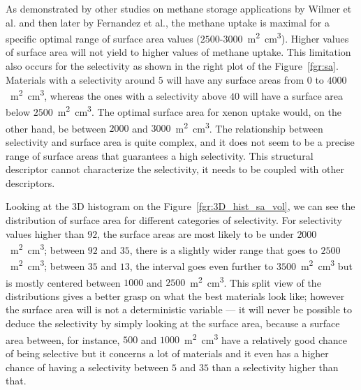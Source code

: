 \documentclass[main.tex]{subfiles}
\begin{document}
As demonstrated by other studies on methane storage applications by Wilmer et al.\autocite{Wilmer_2012} and then later by Fernandez et al.\autocite{Fernandez_2013}, the methane uptake is maximal for a specific optimal range of surface area values ($2500$-$3000$~\si{\square\meter\cubic\centi\meter}). Higher values of surface area will not yield to higher values of methane uptake. This limitation also occurs for the selectivity as shown in the right plot of the Figure~\ref{fgr:sa}. Materials with a selectivity around $5$ will have any surface areas from $0$ to $4000$~\si{\square\meter\cubic\centi\meter}, whereas the ones with a selectivity above $40$ will have a surface area below $2500$~\si{\square\meter\cubic\centi\meter}. The optimal surface area for xenon uptake would, on the other hand, be between $2000$ and $3000$~\si{\square\meter\cubic\centi\meter}. The relationship between selectivity and surface area is quite complex, and it does not seem to be a precise range of surface areas that guarantees a high selectivity. This structural descriptor cannot characterize the selectivity, it needs to be coupled with other descriptors. 

Looking at the 3D histogram on the Figure~\ref{fgr:3D_hist_sa_vol}, we can see the distribution of surface area for different categories of selectivity. For selectivity values higher than $92$, the surface areas are most likely to be under $2000$~\si{\square\meter\cubic\centi\meter}; between $92$ and $35$, there is a slightly wider range that goes to $2500$~\si{\square\meter\cubic\centi\meter}; between $35$ and $13$, the interval goes even further to $3500$~\si{\square\meter\cubic\centi\meter} but is mostly centered between $1000$ and $2500$~\si{\square\meter\cubic\centi\meter}. This split view of the distributions gives a better grasp on what the best materials look like; however the surface area will is not a deterministic variable --- it will never be possible to deduce the selectivity by simply looking at the surface area, because a surface area between, for instance, $500$ and $1000$~\si{\square\meter\cubic\centi\meter} have a relatively good chance of being selective but it concerns a lot of materials and it even has a higher chance of having a selectivity between $5$ and $35$ than a selectivity higher than that. 
\end{document}
